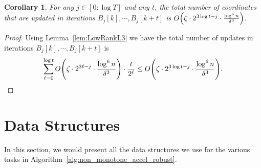 \documentclass[11pt]{article}
\newtheorem{corollary}[theorem]{Corollary}
\let\originalleft\left
\let\originalright\right
\renewcommand{\left}{\mathopen{}\mathclose\bgroup\originalleft}
\renewcommand{\right}{\aftergroup\egroup\originalright}
\begin{document}
\begin{corollary}\label{cor:LowRankL3}
For any $j \in [0:\log T]$ and any $t$, the total number of coordinates that are updated in iterations $B_j[k], \cdots, B_j[k+t]$ is $O\left(\zeta \cdot 2^{3 \log t-j} \cdot \frac{\log^6 n}{\delta^3} \right)$.
\end{corollary}
\begin{proof}
Using Lemma~\ref{lem:LowRankL3} we have the total number of updates in iterations $B_j[k], \cdots, B_j[k+t]$ is
\begin{align*}
\sum_{\ell=0}^{\log t} O\left(\zeta \cdot 2^{3 \ell - j} \cdot \frac{\log^6 n}{\delta^3} \right) \cdot \frac{t}{2^{\ell}} \leq O\left(\zeta \cdot 2^{3 \log t-j} \cdot \frac{\log^6 n}{\delta^3} \right).
\end{align*}
\end{proof} \section{Data Structures}\label{sec:data_structures}
In this section, we would present all the data structures we use for the various tasks in Algorithm~\ref{alg:non_monotone_accel_robust}. 
\end{document}
